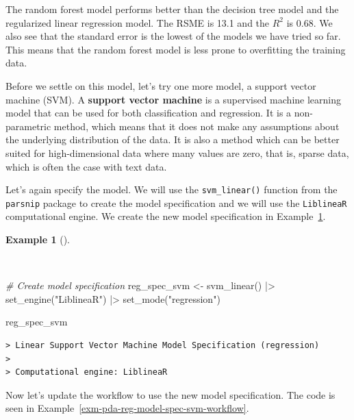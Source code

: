 \documentclass[
  letterpaper,
  DIV=11,
  numbers=noendperiod]{scrreprt}
\newenvironment{Shaded}{\begin{snugshade}}{\end{snugshade}}
\newcommand{\CommentTok}[1]{\textcolor[rgb]{0.00,0.00,0.00}{\textit{#1}}}
\newcommand{\FunctionTok}[1]{\textcolor[rgb]{0.00,0.00,0.00}{#1}}
\newcommand{\NormalTok}[1]{\textcolor[rgb]{0.00,0.00,0.00}{#1}}
\newcommand{\OtherTok}[1]{\textcolor[rgb]{0.00,0.00,0.00}{#1}}
\newcommand{\SpecialCharTok}[1]{\textcolor[rgb]{0.00,0.00,0.00}{#1}}
\newcommand{\StringTok}[1]{\textcolor[rgb]{0.00,0.00,0.00}{#1}}
\theoremstyle{definition}
\newtheorem{example}{Example}[chapter]
\theoremstyle{remark}
\begin{document}
The random forest model performs better than the decision tree model and
the regularized linear regression model. The RSME is 13.1 and the
\(R^2\) is 0.68. We also see that the standard error is the lowest of
the models we have tried so far. This means that the random forest model
is less prone to overfitting the training data.

Before we settle on this model, let's try one more model, a support
vector machine (SVM). A \textbf{support vector machine} is a supervised
machine learning model that can be used for both classification and
regression. It is a non-parametric method, which means that it does not
make any assumptions about the underlying distribution of the data. It
is also a method which can be better suited for high-dimensional data
where many values are zero, that is, sparse data, which is often the
case with text data.

Let's again specify the model. We will use the \texttt{svm\_linear()}
function from the \texttt{parsnip} package to create the model
specification and we will use the \texttt{LiblineaR} computational
engine. We create the new model specification in
Example~\ref{exm-pda-reg-model-spec-svm}.

\begin{example}[]\protect\hypertarget{exm-pda-reg-model-spec-svm}{}\label{exm-pda-reg-model-spec-svm}

~

\begin{Shaded}
\begin{Highlighting}[]
\CommentTok{\# Create model specification}
\NormalTok{reg\_spec\_svm }\OtherTok{\textless{}{-}}
  \FunctionTok{svm\_linear}\NormalTok{() }\SpecialCharTok{|\textgreater{}}
  \FunctionTok{set\_engine}\NormalTok{(}\StringTok{"LiblineaR"}\NormalTok{) }\SpecialCharTok{|\textgreater{}}
  \FunctionTok{set\_mode}\NormalTok{(}\StringTok{"regression"}\NormalTok{)}

\NormalTok{reg\_spec\_svm}
\end{Highlighting}
\end{Shaded}

\begin{verbatim}
> Linear Support Vector Machine Model Specification (regression)
> 
> Computational engine: LiblineaR
\end{verbatim}

\end{example}

Now let's update the workflow to use the new model specification. The
code is seen in Example~\ref{exm-pda-reg-model-spec-svm-workflow}.
\end{document}

